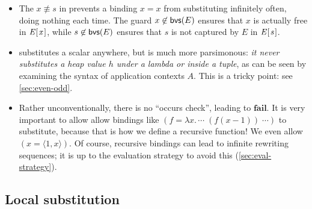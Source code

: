 \documentclass[acmsmall,review,anonymous,dvipsnames]{acmart}
\newcommand{\Conid}[1]{\mathit{#1}}
\newcommand{\Varid}[1]{\mathit{#1}}
\begin{document}
\begin{itemize}
\item The $x \not\equiv s$ in  prevents a binding \ensuremath{\Varid{x}\mathrel{=}\Varid{x}} from substituting
  infinitely often, doing nothing each time.  The guard $x \not\in \mathsf{bvs}(E)$
  ensures that \ensuremath{\Varid{x}} is actually free in \ensuremath{\Conid{E} [\mskip1.5mu \Varid{x}\mskip1.5mu]}, while
  $s \not\in \mathsf{bvs}(E)$ ensures that \ensuremath{\Varid{s}} is not captured by \ensuremath{\Conid{E}} in \ensuremath{\Conid{E} [\mskip1.5mu \Varid{s}\mskip1.5mu]}.

\item {} substitutes a scalar anywhere, but  is much more parsimonous:
\emph{it never substitutes a heap value \ensuremath{\Varid{h}} under a lambda or inside a tuple}, as can be seen by examining
the syntax of application contexts \ensuremath{\Conid{A}}. This is a tricky point: see \cref{sec:even-odd}.

\item Rather unconventionally, there is no ``occurs check'', leading to \ensuremath{\textbf{fail}}.  It is very important to allow
  allow bindings like \ensuremath{(\Varid{f}=\lambda\Varid{x}.\,\cdots\;(\Varid{f}(\Varid{x}\mathbin{-}\mathrm{1}))\;\cdots)} to substitute,
  because that is how we define a recursive function!  We even allow \ensuremath{(\Varid{x}=\langle{}\mathrm{1},\Varid{x}\rangle)}. Of course,
  recursive bindings can lead to infinite rewriting sequences; it is up to the evaluation strategy
  to avoid this (\cref{sec:eval-strategy}).
\end{itemize}

\subsection{Local substitution} \label{sec:local-subst}
\end{document}
